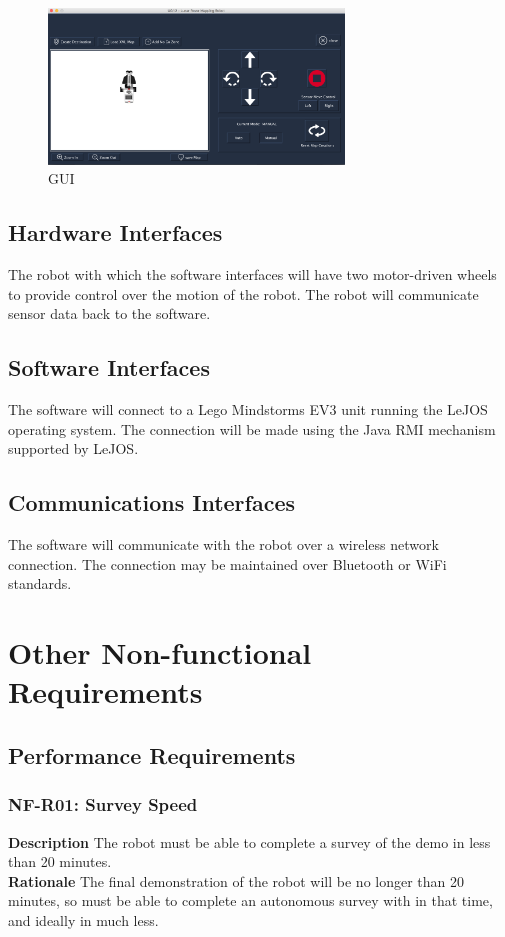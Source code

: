 \documentclass[12pt,a4paper]{article}
\begin{document}
\begin{figure}[h!]
\centering
\includegraphics[width=0.7\textwidth]{GUI}
\caption{GUI}
\label{fig:gui}
\end{figure}

	
	\subsection{Hardware Interfaces}
    The robot with which the software interfaces will have two motor-driven wheels to provide control over the motion of the robot. The robot will communicate sensor data back to the software.
	\subsection{Software Interfaces}
    The software will connect to a Lego Mindstorms EV3 unit running the LeJOS operating system. The connection will be made using the Java RMI mechanism supported by LeJOS.
	\subsection{Communications Interfaces}
    The software will communicate with the robot over a wireless network connection. The connection may be maintained over Bluetooth or WiFi standards.
	\newpage
	\section{Other Non-functional Requirements}
	\subsection{Performance Requirements}
    \subsubsection{NF-R01: Survey Speed}
    \textbf{Description} The robot must be able to complete a survey of the demo in less than 20 minutes.\\
    \textbf{Rationale} The final demonstration of the robot will be no longer than 20 minutes, so must be able to complete an autonomous survey with in that time, and ideally in much less.
\end{document}
